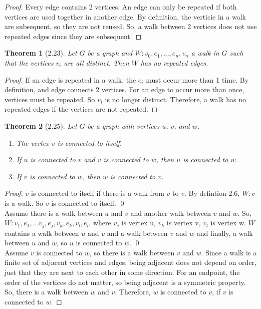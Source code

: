 \documentclass{article}
\newtheorem*{thm}{Theorem}
\begin{document}
\begin{proof}	
	Every edge contains 2 vertices. An edge can only be repeated if both vertices are used together in another edge. By definition, the verticie
	in a walk are subsequent, so they are not reused. So, a walk between 2 vertices does not use repeated edges since they are subsequent.

\end{proof}

\begin{thm}[2.23]
	Let $G$ be a graph and $W: v_0, e_1, ..., e_n, v_n$ a walk in $G$ such that the vertices $v_i$ are all distinct. Then $W$ has no repeated edges. \end{thm}

\begin{proof}
    If an edge is repeated in a walk, the $e_i$ must occur more than 1 time. By definition, and edge connects 2 vertices. For an edge to occur more than
	once, vertices must be repeated. So $v_i$ is no longer distinct. Therefore, a walk has no repeated edges if the vertices are not repeated. 
\end{proof}

\begin{thm}[2.25]
	Let $G$ be a graph with vertices $u$, $v$, and $w$. 
	\begin{enumerate}
	  \item The vertex $v$ is connected to itself. 
	  \item If $u$ is connected to $v$ and $v$ is connected to $w$, then $u$ is connected to $w$.
	  \item If $v$ is connected to $w$, then $w$ is connected to $v$.
	\end{enumerate}
\end{thm}

\begin{proof}
	$v$ is connected to itself if there is a walk from $v$ to $v$. By defintion 2.6, $W: v$ is a walk. So $v$ is connected to itself. \qed
	\\
	Assume there is a walk between $u$ and $v$ and another walk between $v$ and $w$. So, $W: v_1, e_1, ... v_j, e_j, v_k, e_k, v_l, e_l$, where $v_j$ is vertex u, $v_k$ is vertex v, $v_l$ is vertex w. $W$ contains a walk between $u$ and $v$ and a walk between $v$ and $w$ and finally, a walk between $u$ and $w$,
so $u$ is connected to $w$. \qed
	\\
	Assume $v$ is connected to $w$, so there is a walk between $v$ and $w$. Since a walk is a finite set of adjacent vertices and edges, being adjacent 
	does not depend on order, just that they are next to each other in some direction. For an endpoint, the order of the vertices do not matter, so
	being adjacent is a symmetric property. So, there is a walk between $w$ and $v$. Therefore, $w$ is connected to $v$, if $v$ is connected to
	$w$. 
  
\end{proof}
\end{document}
